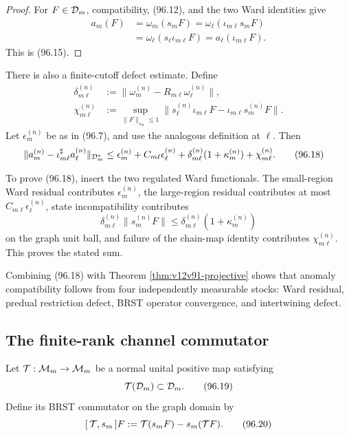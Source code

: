\documentclass[11pt]{article}
\theoremstyle{remark}
\begin{document}
\begin{proof}
For \(F\in{\cal D}_m\), compatibility, (96.12), and the two Ward
identities give
\[
 \begin{split}
 a_m(F)
 &=\omega_m(s_mF)
 =\omega_\ell(\iota_{m\ell}s_mF)\\
 &=\omega_\ell(s_\ell\iota_{m\ell}F)
 =a_\ell(\iota_{m\ell}F).
 \end{split}                                                     \tag{96.16}
\]
This is (96.15).
\end{proof}

There is also a finite-cutoff defect estimate.  Define
\[
 \begin{split}
 \delta_{m\ell}^{(n)}
 &:=\|\omega_m^{(n)}
       -R_{m\ell}\omega_\ell^{(n)}\|,\\
 \chi_{m\ell}^{(n)}
 &:=\sup_{\|F\|_{s_m}\leq1}
 \|s_\ell^{(n)}\iota_{m\ell}F
       -\iota_{m\ell}s_m^{(n)}F\|.                              \tag{96.17}
 \end{split}
\]
Let \(\epsilon_m^{(n)}\) be as in (96.7), and use the analogous
definition at \(\ell\).  Then
\[
\begin{split}
 \|a_m^{(n)}-\iota_{m\ell}^{\sharp}a_\ell^{(n)}\|_{{\cal D}_m^*}
 \leq{}&
 \epsilon_m^{(n)}
 +C_{m\ell}\epsilon_\ell^{(n)}
 +\delta_{m\ell}^{(n)}(1+\kappa_m^{(n)})
 +\chi_{m\ell}^{(n)}.                                           \tag{96.18}
\end{split}
\]

To prove (96.18), insert the two regulated Ward functionals.  The
small-region Ward residual contributes \(\epsilon_m^{(n)}\), the
large-region residual contributes at most
\(C_{m\ell}\epsilon_\ell^{(n)}\), state incompatibility contributes
\[
 \delta_{m\ell}^{(n)}\|s_m^{(n)}F\|
 \leq\delta_{m\ell}^{(n)}(1+\kappa_m^{(n)})
\]
on the graph unit ball, and failure of the chain-map identity
contributes \(\chi_{m\ell}^{(n)}\).  This proves the stated sum.

Combining (96.18) with Theorem
\ref{thm:v12v91-projective} shows that anomaly compatibility follows
from four independently measurable stocks: Ward residual,
predual restriction defect, BRST operator convergence, and
intertwining defect.

\subsection{The finite-rank channel commutator}

Let \({\cal T}:{\cal M}_m\to{\cal M}_m\) be a normal unital positive
map satisfying
\[
 {\cal T}({\cal D}_m)\subset{\cal D}_m.                           \tag{96.19}
\]
Define its BRST commutator on the graph domain by
\[
 [\,{\cal T},s_m\,]F
 :={\cal T}(s_mF)-s_m({\cal T}F).                                \tag{96.20}
\]
\end{document}
